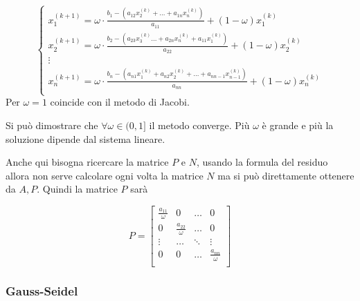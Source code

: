 \begin{equation*}
    \begin{cases}
        x_1^{(k+1)} = \omega \cdot \frac{b_1 - (a_{12} x_2^{(k)} + \dots + a_{1n} x_n^{(k)})}{ a_{11}} +(1-\omega) x_1^{(k)}\\
        x_2^{(k+1)} =\omega \cdot \frac{ b_2 - (a_{23} x_3^{(k)}\dots + a_{2n} x_n^{(k)} + a_{11}x_1^{(k)})}{a_{22}}+(1-\omega) x_2^{(k)}\\
        \vdots                                           \\
        x_n^{(k+1)}= \omega \cdot \frac{b_n - (a_{n1}x_1^{(k)} + a_{n2} x_2^{(k)} + \dots + a_{nn-1} x_{n-1}^{(k)})}{a_{nn}}+(1-\omega) x_n^{(k)}\\
    \end{cases}
\end{equation*}
Per $\omega = 1 $ coincide con il metodo di Jacobi. 

Si può dimostrare che $\forall \omega \in (0,1]$ il metodo converge. Più $\omega$
è grande e più la soluzione dipende dal sistema lineare.

Anche qui bisogna ricercare la matrice $P$ e $N$, usando la formula del residuo allora
non serve calcolare ogni volta la matrice $N$ ma si può direttamente ottenere da 
$A,P$. Quindi la matrice $P$ sarà


\begin{equation*}
    P= \left[\begin{array}{cccc}
        \frac{a_{11}}{\omega} & 0 & \dots & 0\\
        0 & \frac{a_{22}}{\omega} & \dots & 0\\
        \vdots & \dots & \ddots & \vdots\\
        0 & 0 & \dots & \frac{a_{nn}}{\omega}\\
    \end{array}\right]
\end{equation*}

\subsubsection{Gauss-Seidel}

